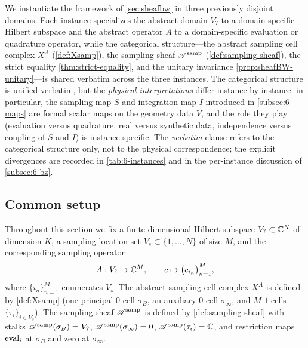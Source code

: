 %

\noindent
We instantiate the framework of \cref{sec:sheafbw} in three previously
disjoint domains. Each instance specializes the abstract domain $V_?$
to a domain-specific Hilbert subspace and the abstract operator $A$ to
a domain-specific evaluation or quadrature operator, while the
categorical structure---the abstract sampling cell complex $X^A$
(\cref{def:Xsamp}), the sampling sheaf $\mathscr{A}^{\mathrm{samp}}$
(\cref{def:sampling-sheaf}), the strict equality
\cref{thm:strict-equality}, and the unitary invariance
\cref{prop:sheafBW-unitary}---is shared verbatim across the three
instances. The categorical structure is unified verbatim, but the
\emph{physical interpretations} differ instance by instance: in
particular, the sampling map $S$ and integration map $I$ introduced in
\cref{subsec:6-maps} are formal scalar maps on the geometry data $V$,
and the role they play (evaluation versus quadrature, real versus
synthetic data, independence versus coupling of $S$ and $I$) is
instance-specific. The \emph{verbatim} clause refers to the categorical
structure only, not to the physical correspondence; the explicit
divergences are recorded in \cref{tab:6-instances} and in the
per-instance discussion of \cref{subsec:6-bz}.

\subsection{Common setup}\label{subsec:6-common}

Throughout this section we fix a finite-dimensional Hilbert subspace
$V_? \subset \mathbb{C}^N$ of dimension $K$, a sampling location set
$V_s \subset \{1, \dots, N\}$ of size $M$, and the corresponding
sampling operator
\[
  A : V_? \to \mathbb{C}^M,
  \qquad
  c \mapsto \bigl(c_{i_n}\bigr)_{n=1}^{M},
\]
where $\{i_n\}_{n=1}^{M}$ enumerates $V_s$. The abstract sampling cell
complex $X^A$ is defined by \cref{def:Xsamp} (one principal $0$-cell
$\sigma_B$, an auxiliary $0$-cell $\sigma_\infty$, and $M$ $1$-cells
$\{\tau_i\}_{i \in V_s}$). The sampling sheaf $\mathscr{A}^{\mathrm{samp}}$ is defined by
\cref{def:sampling-sheaf} with stalks $\mathscr{A}^{\mathrm{samp}}(\sigma_B) = V_?$,
$\mathscr{A}^{\mathrm{samp}}(\sigma_\infty) = 0$, $\mathscr{A}^{\mathrm{samp}}(\tau_i) = \mathbb{C}$, and restriction
maps $\operatorname{eval}_i$ at $\sigma_B$ and zero at $\sigma_\infty$.

